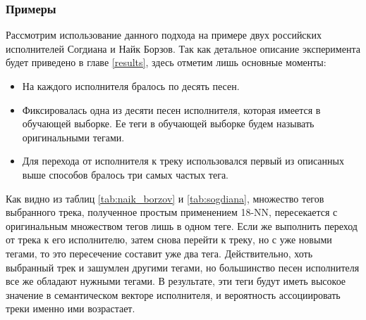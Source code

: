 \subsubsection{Примеры}

Рассмотрим использование данного подхода на примере двух российских исполнителей \ld Согдиана и Найк Борзов. Так как детальное описание эксперимента будет приведено в главе \ref{results},
здесь отметим лишь основные моменты:
\begin{itemize}
 \item На каждого исполнителя бралось по десять песен.
 \item Фиксировалась одна из десяти песен исполнителя, которая имеется в обучающей выборке. Ее теги в обучающей выборке будем называть оригинальными тегами.
 \item Для перехода от исполнителя к треку использовался первый из описанных выше способов \ld бралось три самых частых тега.
\end{itemize}

Как видно из таблиц \ref{tab:naik_borzov} и \ref{tab:sogdiana}, множество тегов выбранного трека, полученное простым применением 18-NN, 
пересекается с оригинальным множеством тегов лишь в одном теге. Если же выполнить переход от трека к его исполнителю, затем снова перейти к треку, но с уже новыми тегами,
то это пересечение составит уже два тега. Действительно, хоть выбранный трек и зашумлен другими тегами, но большинство песен исполнителя все же обладают нужными тегами.
В результате, эти теги будут иметь высокое значение в семантическом векторе исполнителя, и вероятность ассоциировать треки именно ими возрастает.

